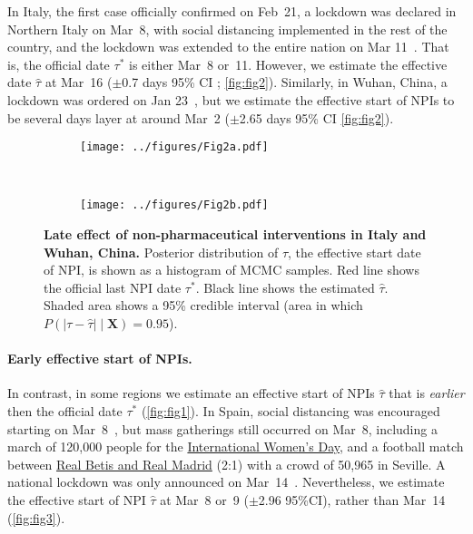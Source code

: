 \documentclass[12pt]{extarticle}
\let\vec\mathbf
\begin{document}
In Italy, the first case officially confirmed on Feb~21, a lockdown was declared in Northern Italy on Mar~8, with social distancing implemented in the rest of the country, and the lockdown was extended to the entire nation on Mar 11~\citep{Gatto2020}.
That is, the official date $\tau^*$ is either Mar~8 or~11.
However, we estimate the effective date $\hat{\tau}$ at Mar~16 ($\pm$0.7 days 95\% CI ; \autoref{fig:fig2}).
Similarly, in Wuhan, China, a lockdown was ordered on Jan 23~\citep{Li2020}, but we estimate  the effective start of NPIs to be several days layer at around Mar~2 ($\pm$2.65 days 95\% CI \autoref{fig:fig2}).


\begin{figure}[h]
    \centering
    \begin{subfigure}{0.45\textwidth}
        \texttt{[image: ../figures/Fig2a.pdf]}
    \end{subfigure}
  	~
    \begin{subfigure}{0.45\textwidth}
        \texttt{[image: ../figures/Fig2b.pdf]}
    \end{subfigure}
    \caption{
	\textbf{Late effect of non-pharmaceutical interventions in Italy and Wuhan, China.}
    Posterior distribution of $\tau$, the effective start date of NPI, is shown as a histogram of MCMC samples. Red line shows the official last NPI date $\tau^*$. Black line shows the estimated $\hat{\tau}$. Shaded area shows a 95\% credible interval (area in which $P(|\tau - \hat{\tau}| \mid \vec{X}) = 0.95$). 
    }
    \label{fig:fig2}
\end{figure}



\paragraph*{Early effective start of NPIs.}
In contrast, in some regions we estimate an effective start of NPIs $\hat{\tau}$ that is \emph{earlier} then the official date $\tau^*$ (\autoref{fig:fig1}).
In Spain, social distancing was encouraged starting on Mar~8~\citep{Flaxman2020}, but mass gatherings still occurred on Mar~8, including a march of 120,000 people for the \href{https://www.nytimes.com/2020/03/13/world/europe/spain-coronavirus-emergency.html}{International Women's Day}, and a  football match between \href{https://www.espn.com/soccer/match?gameId=550350}{Real Betis and Real Madrid} (2:1) with a crowd of 50,965 in Seville.
A national lockdown was only announced on Mar~14~\citep{Flaxman2020}.
Nevertheless, we estimate the effective start of NPI $\hat{\tau}$ at Mar~8 or~9 ($\pm$2.96 95\%CI), rather than Mar~14 (\autoref{fig:fig3}).
\end{document}
